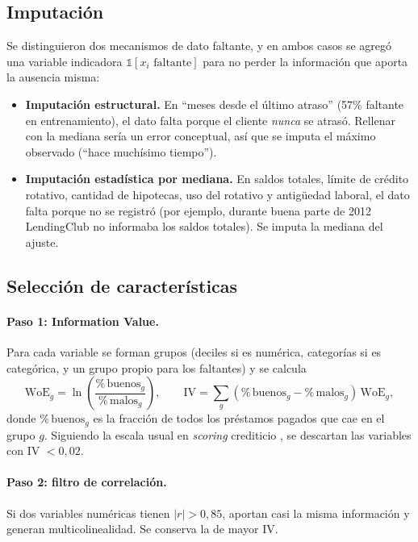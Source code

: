 \documentclass{article}
\begin{document}
\subsection{Imputación}
Se distinguieron dos mecanismos de dato faltante, y en ambos casos se agregó una
variable indicadora $\mathbb{1}[x_i \text{ faltante}]$ para no perder la
información que aporta la ausencia misma:
\begin{itemize}
  \item \textbf{Imputación estructural.} En ``meses desde el último atraso''
        (57\% faltante en entrenamiento), el dato falta porque el cliente \emph{nunca} se
        atrasó. Rellenar con la mediana sería un error conceptual, así que se
        imputa el máximo observado (``hace muchísimo tiempo'').
  \item \textbf{Imputación estadística por mediana.} En saldos totales, límite
        de crédito rotativo, cantidad de hipotecas, uso del rotativo y
        antigüedad laboral, el dato falta porque no se registró (por ejemplo,
        durante buena parte de 2012 LendingClub no informaba los saldos totales).
        Se imputa la mediana del ajuste.
\end{itemize}

\subsection{Selección de características}
\paragraph{Paso 1: Information Value.} Para cada variable se forman grupos (deciles
si es numérica, categorías si es categórica, y un grupo propio para los faltantes)
y se calcula
\begin{equation}
\text{WoE}_g = \ln\!\left(\frac{\%\,\text{buenos}_g}{\%\,\text{malos}_g}\right),
\qquad
\text{IV} = \sum_{g} \left(\%\,\text{buenos}_g - \%\,\text{malos}_g\right)\,\text{WoE}_g ,
\label{eq:woe}
\end{equation}
donde $\%\,\text{buenos}_g$ es la fracción de todos los préstamos pagados que cae en
el grupo $g$. Siguiendo la escala usual en \emph{scoring} crediticio
\cite{siddiqi2006}, se descartan las variables con IV $< 0{,}02$.

\paragraph{Paso 2: filtro de correlación.} Si dos variables numéricas tienen
$|r| > 0{,}85$, aportan casi la misma información y generan multicolinealidad. Se
conserva la de mayor IV.
\end{document}
